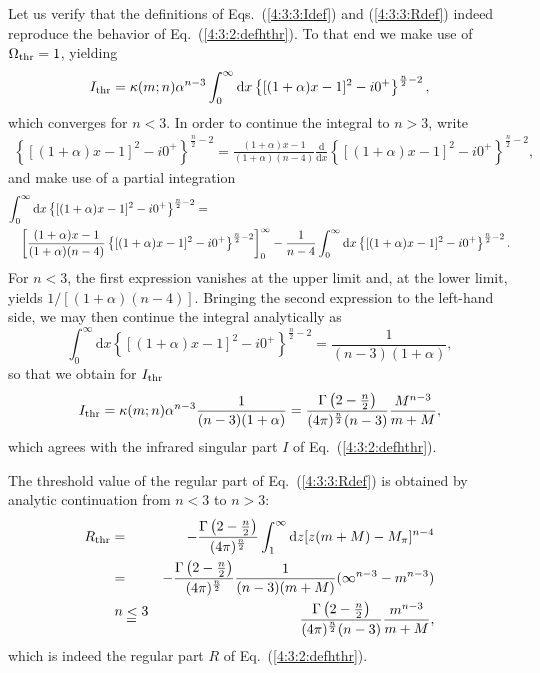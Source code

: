 \documentclass[twoside,12pt]{article}
\begin{document}
   Let us verify that the definitions of Eqs.\ (\ref{4:3:3:Idef}) and
(\ref{4:3:3:Rdef}) indeed reproduce the behavior of Eq.\ (\ref{4:3:2:defhthr}).
   To that end we make use of $\Omega_{\rm thr}=1$, yielding
\begin{equation}
\label{4:3:3:ithr1}
I_{\rm thr}=\kappa(m;n)\alpha^{n-3}\int_0^\infty \mbox{d}x
\left\{[(1+\alpha)x-1]^2-i0^+
\right\}^{\frac{n}{2}-2},
\end{equation}
which converges for $n<3$.
   In order to continue the integral to $n>3$, write
\cite{Becher:1999he}
\begin{eqnarray*}
\left\{[(1+\alpha)x-1]^2-i0^+\right\}^{\frac{n}{2}-2}=
\frac{(1+\alpha)x-1}{(1+\alpha)(n-4)}\frac{\mbox{d}}{\mbox{d}x}
\left\{[(1+\alpha)x-1]^2-i0^+\right\}^{\frac{n}{2}-2},
\end{eqnarray*}
and make use of a partial integration
\begin{eqnarray*}
\lefteqn{\int_0^\infty \mbox{d}x
\left\{[(1+\alpha)x-1]^2-i0^+\right\}^{\frac{n}{2}-2}
=}\\
&&\left[\frac{(1+\alpha)x-1}{(1+\alpha)(n-4)}
\left\{[(1+\alpha)x-1]^2-i0^+\right\}^{\frac{n}{2}-2}
\right]_0^\infty-\frac{1}{n-4}
\int_0^\infty \mbox{d}x \left\{[(1+\alpha)x-1]^2-i0^+\right\}^{\frac{n}{2}-2}.
\end{eqnarray*}
   For $n<3$, the first expression vanishes at the upper limit and,
at the lower limit, yields $1/[(1+\alpha)(n-4)]$.
   Bringing the second expression to the left-hand side, we may then
continue the integral analytically as
\begin{equation}
\label{5:6:intanc}
\int_0^\infty \mbox{d}x\left\{[(1+\alpha)x-1]^2-i0^+
\right\}^{\frac{n}{2}-2}=\frac{1}{(n-3)(1+\alpha)},
\end{equation}
so that we obtain for $I_{\rm thr}$
\begin{equation}
\label{4:3:3:ithr}
I_{\rm thr}=\kappa(m;n)\alpha^{n-3}\frac{1}{(n-3)(1+\alpha)}
=
\frac{\Gamma\left(2-\frac{n}{2}\right)}{(4\pi)^{\frac{n}{2}}(n-3)}
\frac{M^{n-3}}{m+M},
\end{equation}
which agrees with the infrared singular part $I$ of Eq.\ (\ref{4:3:2:defhthr}).

  The threshold value of the regular part of
Eq.\ (\ref{4:3:3:Rdef}) is obtained by analytic continuation from $n<3$
to $n>3$:
\begin{eqnarray}
\label{4:3:3:Rthr}
 R_{\rm thr}&=&-\frac{\Gamma\left(2-\frac{n}{2}\right)}{(4\pi)^{\frac{n}{2}}}
\int_1^\infty \mbox{d}z [z(m+M)-M_\pi]^{n-4}\nonumber\\
&=& -\frac{\Gamma\left(2-\frac{n}{2}\right)}{(4\pi)^{\frac{n}{2}}}
\frac{1}{(n-3)(m+M)}(\infty^{n-3}-m^{n-3})\nonumber\\
&\stackrel{\mbox{$n<3$}}{=}&\frac{\Gamma\left(2-\frac{n}{2}\right)}{(4\pi)^{\frac{n}{2}}(n-3)}
\frac{m^{n-3}}{m+M},
\end{eqnarray}
which is indeed the regular part $R$ of Eq.\ (\ref{4:3:2:defhthr}).
\end{document}
